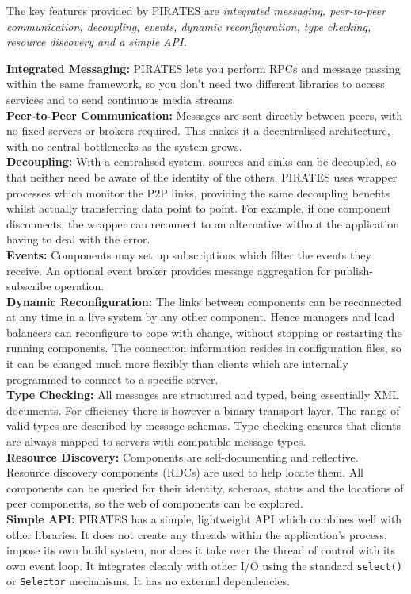\documentclass[12pt,a4paper,twoside]{article}
\renewcommand{\_}{\texttt{\symbol{95}}}
\begin{document}
The key features provided by PIRATES are \textit{integrated messaging,
peer-to-peer communication, decoupling, events, dynamic reconfiguration,
type checking, resource discovery and a simple API.}

\textbf{Integrated Messaging:} PIRATES lets you perform RPCs and
message passing within the same framework, so you don't need
two different libraries to access services and to send continuous
media streams.\\
\textbf{Peer-to-Peer Communication:} Messages are sent directly
between peers, with no fixed servers or brokers required.
This makes it a decentralised architecture, with no central
bottlenecks as the system grows.\\
\textbf{Decoupling:} With a centralised system, sources and
sinks can be decoupled, so that neither need be aware of the identity
of the others.
PIRATES uses wrapper processes which monitor the P2P links,
providing the same decoupling benefits whilst actually transferring
data point to point. For example, if one component disconnects, the wrapper
can reconnect to an alternative without the application
having to deal with the error.\\
\textbf{Events:} Components may set up subscriptions which filter
the events they receive. An optional event broker provides
message aggregation for publish-subscribe operation.\\
\textbf{Dynamic Reconfiguration:}
The links between components can be reconnected at any time in a live
system by any other component. Hence managers and load balancers
can reconfigure to cope with change, without stopping or restarting the
running components.
The connection information resides in configuration files, so it
can be changed much more flexibly than clients which are internally
programmed to connect to a specific server.\\
\textbf{Type Checking:}
All messages are structured and typed, being essentially XML documents.
For efficiency there is however a binary transport layer.
The range of valid types are described by message schemas.
Type checking ensures that clients are always mapped to servers
with compatible message types.\\
\textbf{Resource Discovery:}
Components are self-documenting and reflective.
Resource discovery components (RDCs) are used to help locate them.
All components can be queried for their identity, schemas, status
and the locations of peer components, so the web of components
can be explored.\\
\textbf{Simple API:}
PIRATES has a simple, lightweight API which combines well with
other libraries. It does not create
any threads within the application's process, impose its own build
system, nor does it take over the thread of control with its own event loop.
It integrates cleanly with other I/O using the standard \verb^select()^
or \verb^Selector^ mechanisms. It has no external dependencies.\\
\end{document}
